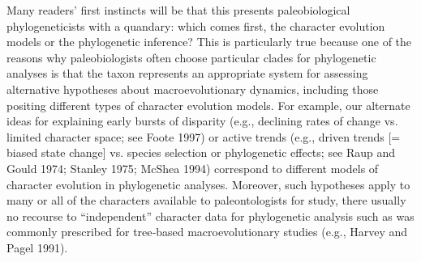 \documentclass{article}
\begin{document}
Many readers’ first instincts will be that this presents paleobiological phylogeneticists with a quandary: which comes first, the character evolution models or the phylogenetic inference?  
This is particularly true because one of the reasons why paleobiologists often choose particular clades for phylogenetic analyses is that the taxon represents an appropriate system for assessing alternative hypotheses about macroevolutionary dynamics, including those positing different types of character evolution models.  
For example, our alternate ideas for explaining early bursts of disparity (e.g., declining rates of change vs. limited character space; see Foote 1997) or active trends (e.g., driven trends [= biased state change] vs. species selection or phylogenetic effects; see Raup and Gould 1974; Stanley 1975; McShea 1994) correspond to different models of character evolution in phylogenetic analyses. 
Moreover, such hypotheses apply to many or all of the characters available to paleontologists for study, there usually no recourse to “independent” character data for phylogenetic analysis such as was commonly prescribed for tree‑based macroevolutionary studies (e.g., Harvey and Pagel 1991).

\end{document}
